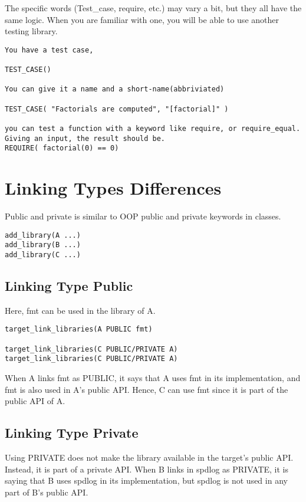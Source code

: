The specific words (Test\_case, require, etc.) may vary a bit, but they all have the same logic. When you are familiar with one, 
you will be able to use another testing library.

\begin{verbatim}
You have a test case, 

TEST_CASE()

You can give it a name and a short-name(abbriviated)

TEST_CASE( "Factorials are computed", "[factorial]" )

you can test a function with a keyword like require, or require_equal. Giving an input, the result should be. 
REQUIRE( factorial(0) == 0)
\end{verbatim}

\section{Linking Types Differences} 

Public and private is similar to OOP public and private keywords in classes.

\begin{verbatim}
add_library(A ...)
add_library(B ...)
add_library(C ...)
\end{verbatim}

\subsection{Linking Type Public}

Here, fmt can be used in the library of A. 

\begin{verbatim}
target_link_libraries(A PUBLIC fmt)

target_link_libraries(C PUBLIC/PRIVATE A)
target_link_libraries(C PUBLIC/PRIVATE A)
\end{verbatim}

When A links fmt as PUBLIC, it says that A uses fmt in its implementation, and fmt is also used in A's public API.
Hence, C can use fmt since it is part of the public API of A.

\subsection{Linking Type Private}

Using PRIVATE does not make the library available in the target's public API. Instead, it is part of a private API.
When B links in spdlog as PRIVATE, it is saying that B uses spdlog in its implementation,
but spdlog is not used in any part of B's public API. 

